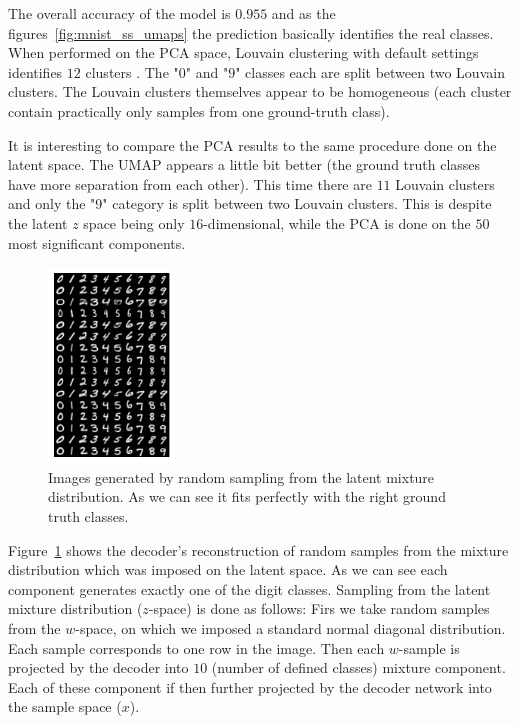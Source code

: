 \documentclass[11pt, a4paper]{report}
\theoremstyle{plain}
\theoremstyle{definition}
\theoremstyle{remark}
\begin{document}
The overall accuracy of the model is $0.955$ and as
the figures~\ref{fig:mnist_ss_umaps} the prediction basically identifies the
real classes.
When performed on the PCA space, Louvain clustering with default settings identifies $12$ clusters
. The "$0$" and "$9$" classes each are split
between two Louvain clusters. The Louvain clusters themselves appear to be
homogeneous (each cluster contain practically only samples from one ground-truth
class).

It is interesting to compare the PCA results to the same procedure done on the
latent space.
The UMAP appears a little bit better (the ground truth classes have more
separation from each other).
This time there are $11$ Louvain clusters and only the "9"
category is split between two Louvain clusters.
This is despite the latent $z$ space being only $16$-dimensional, while the PCA
is done on the $50$ most significant components.

\begin{figure}[h]
\centering
\includegraphics[width=0.3\textwidth]{images/gmmvae_mnist_ss_samples.png}
\caption{Images generated by random sampling from the latent mixture
distribution. As we can see it fits perfectly with the right ground truth
classes.}
\label{fig:mnist_ss_samples}
\end{figure}

Figure~\ref{fig:mnist_ss_samples} shows the decoder's reconstruction of random
samples from the mixture distribution which was imposed on the latent space.
As we can see each component generates exactly one of the digit classes.
Sampling from the latent mixture distribution ($z$-space) is done as follows:
Firs we take random samples from the $w$-space, on which we imposed a standard
normal diagonal distribution. Each sample corresponds to one row in the image.
Then each $w$-sample is projected by the decoder into $10$ (number of defined
classes) mixture component. Each of these component if then further projected by
the decoder network into the sample space ($x$). 
\end{document}
